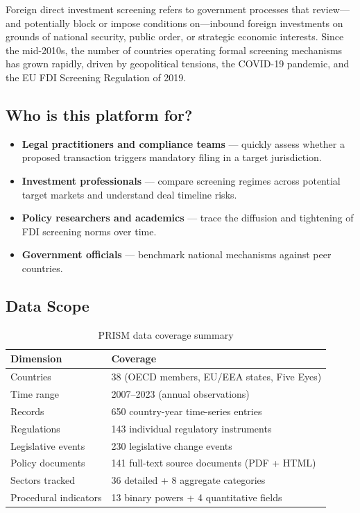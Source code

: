 \documentclass[12pt,a4paper]{article}
\begin{document}
Foreign direct investment screening refers to government processes that review—and potentially block or impose conditions on—inbound foreign investments on grounds of national security, public order, or strategic economic interests. Since the mid-2010s, the number of countries operating formal screening mechanisms has grown rapidly, driven by geopolitical tensions, the COVID-19 pandemic, and the EU FDI Screening Regulation of 2019.

\subsection{Who is this platform for?}

\begin{itemize}
  \item \textbf{Legal practitioners and compliance teams} — quickly assess whether a proposed transaction triggers mandatory filing in a target jurisdiction.
  \item \textbf{Investment professionals} — compare screening regimes across potential target markets and understand deal timeline risks.
  \item \textbf{Policy researchers and academics} — trace the diffusion and tightening of FDI screening norms over time.
  \item \textbf{Government officials} — benchmark national mechanisms against peer countries.
\end{itemize}

\subsection{Data Scope}

\begin{table}[h]
\centering
\begin{tabularx}{\linewidth}{lX}
\toprule
\textbf{Dimension} & \textbf{Coverage} \\
\midrule
Countries & 38 (OECD members, EU/EEA states, Five Eyes) \\
Time range & 2007--2023 (annual observations) \\
Records & 650 country-year time-series entries \\
Regulations & 143 individual regulatory instruments \\
Legislative events & 230 legislative change events \\
Policy documents & 141 full-text source documents (PDF + HTML) \\
Sectors tracked & 36 detailed + 8 aggregate categories \\
Procedural indicators & 13 binary powers + 4 quantitative fields \\
\bottomrule
\end{tabularx}
\caption{PRISM data coverage summary}
\end{table}
\end{document}
